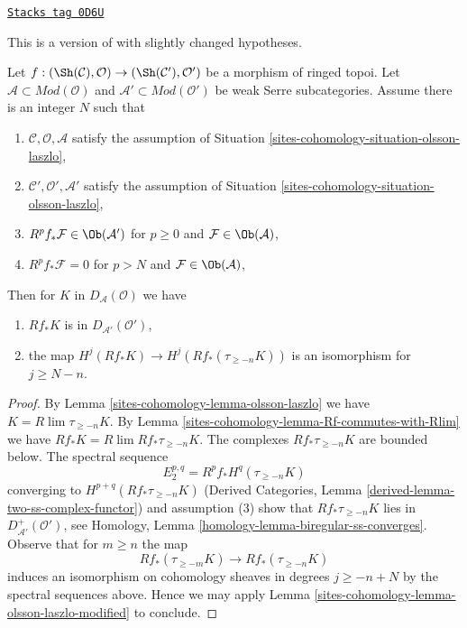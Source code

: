 \begin{lemma}
\label{sites-cohomology-lemma-olsson-laszlo-map-version-one}
\href{https://stacks.math.columbia.edu/tag/0D6U}{\texttt{Stacks tag 0D6U}}

\begin{reference}
This is a version of \cite[Lemma 2.1.10]{six-I} with slightly changed
hypotheses.
\end{reference}
Let $f : (\Sh(\mathcal{C}), \mathcal{O}) \to (\Sh(\mathcal{C}'), \mathcal{O}')$
be a morphism of ringed topoi.
Let $\mathcal{A} \subset \textit{Mod}(\mathcal{O})$
and $\mathcal{A}' \subset \textit{Mod}(\mathcal{O}')$
be weak Serre subcategories. Assume there is an integer $N$ such that
\begin{enumerate}
\item $\mathcal{C}, \mathcal{O}, \mathcal{A}$ satisfy the
assumption of Situation \ref{sites-cohomology-situation-olsson-laszlo},
\item $\mathcal{C}', \mathcal{O}', \mathcal{A}'$ satisfy the
assumption of Situation \ref{sites-cohomology-situation-olsson-laszlo},
\item $R^pf_*\mathcal{F} \in \Ob(\mathcal{A}')$ for
$p \geq 0$ and $\mathcal{F} \in \Ob(\mathcal{A})$,
\item $R^pf_*\mathcal{F} = 0$ for
$p > N$ and $\mathcal{F} \in \Ob(\mathcal{A})$,
\end{enumerate}
Then for $K$ in $D_\mathcal{A}(\mathcal{O})$ we have
\begin{enumerate}
\item[(a)] $Rf_*K$ is in $D_{\mathcal{A}'}(\mathcal{O}')$,
\item[(b)] the map
$H^j(Rf_*K) \to H^j(Rf_*(\tau_{\geq -n}K))$ is an isomorphism
for $j \geq N - n$.
\end{enumerate}
\end{lemma}

\begin{proof}
By Lemma \ref{sites-cohomology-lemma-olsson-laszlo} we have $K = R\lim \tau_{\geq -n}K$.
By Lemma \ref{sites-cohomology-lemma-Rf-commutes-with-Rlim}
we have $Rf_*K = R\lim Rf_*\tau_{\geq -n}K$.
The complexes $Rf_*\tau_{\geq -n}K$ are bounded below.
The spectral sequence
$$
E_2^{p, q} = R^pf_*H^q(\tau_{\geq -n}K)
$$
converging to $H^{p + q}(Rf_*\tau_{\geq -n}K)$
(Derived Categories, Lemma \ref{derived-lemma-two-ss-complex-functor})
and assumption (3)
show that $Rf_*\tau_{\geq -n}K$ lies in $D^+_{\mathcal{A}'}(\mathcal{O}')$,
see Homology, Lemma \ref{homology-lemma-biregular-ss-converges}.
Observe that for $m \geq n$ the map
$$
Rf_*(\tau_{\geq -m}K) \longrightarrow Rf_*(\tau_{\geq -n}K)
$$
induces an isomorphism on cohomology sheaves in degrees $j \geq -n + N$
by the spectral sequences above. Hence we may apply
Lemma \ref{sites-cohomology-lemma-olsson-laszlo-modified} to conclude.
\end{proof}

